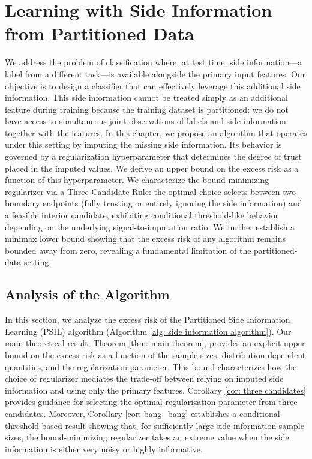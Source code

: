 \chapter{Learning with Side Information from Partitioned Data}
\label{ch:side_info}
\graphicspath{{Chapter_3_Side_Information/Figures/}{Chapter_3_Side_Information/code/}}

We address the problem of classification where, at test time, side information---a label from a different task---is available alongside the primary input features. Our objective is to design a classifier that can effectively leverage this additional side information. This side information cannot be treated simply as an additional feature during training because the training dataset is partitioned: we do not have access to simultaneous joint observations of labels and side information together with the features. In this chapter, we propose an algorithm that operates under this setting by imputing the missing side information. Its behavior is governed by a regularization hyperparameter that determines the degree of trust placed in the imputed values. We derive an upper bound on the excess risk as a function of this hyperparameter. We characterize the bound-minimizing regularizer via a Three-Candidate Rule: the optimal choice selects between two boundary endpoints (fully trusting or entirely ignoring the side information) and a feasible interior candidate, exhibiting conditional threshold-like behavior depending on the underlying signal-to-imputation ratio. We further establish a minimax lower bound showing that the excess risk of any algorithm remains bounded away from zero, revealing a fundamental limitation of the partitioned-data setting.





\section{Analysis of the Algorithm}
In this section, we analyze the excess risk of the Partitioned Side Information Learning (PSIL) algorithm (Algorithm \ref{alg: side information algorithm}). Our main theoretical result, Theorem \ref{thm: main theorem}, provides an explicit upper bound on the excess risk as a function of the sample sizes, distribution-dependent quantities, and the regularization parameter. This bound characterizes how the choice of regularizer mediates the trade-off between relying on imputed side information and using only the primary features. Corollary \ref{cor: three candidates} provides guidance for selecting the optimal regularization parameter from three candidates. Moreover, Corollary \ref{cor: bang_bang} establishes a conditional threshold-based result showing that, for sufficiently large side information sample sizes, the bound-minimizing regularizer takes an extreme value when the side information is either very noisy or highly informative. 

